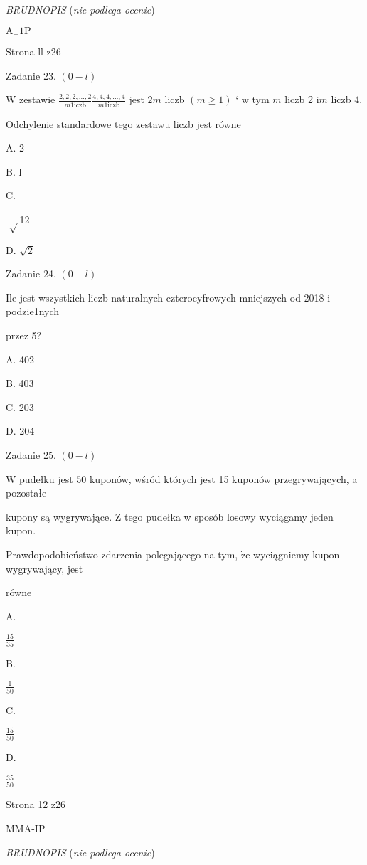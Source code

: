 \documentclass[a4paper,12pt]{article}
\begin{document}
{\it BRUDNOPIS} ({\it nie podlega ocenie})

$\mathrm{A}_{-}1\mathrm{P}$

Strona ll z26





Zadanie 23. $(0-l)$

$\mathrm{W}$ zestawie $\displaystyle \frac{2,2,2,\ldots,2}{m1\mathrm{i}\mathrm{c}\mathrm{z}\mathrm{b}}\frac{4,4,4,\ldots,4}{m1\mathrm{i}\mathrm{c}\mathrm{z}\mathrm{b}}$ jest $2m$ liczb $(m\geq 1)$ ` w tym $m$ liczb 2 $\mathrm{i} m$ liczb 4.

Odchylenie standardowe tego zestawu liczb jest równe

A. 2

B. l

C.

-$\sqrt{}$12

D. $\sqrt{2}$

Zadanie 24. $(0-l)$

Ile jest wszystkich liczb naturalnych czterocyfrowych mniejszych od 2018 i podzie1nych

przez 5?

A. 402

B. 403

C. 203

D. 204

Zadanie 25. $(0-l)$

$\mathrm{W}$ pudełku jest 50 kuponów, wśród których jest 15 kuponów przegrywających, a pozostałe

kupony są wygrywające. $\mathrm{Z}$ tego pudełka w sposób losowy wyciągamy jeden kupon.

Prawdopodobieństwo zdarzenia polegającego na tym, $\dot{\mathrm{z}}\mathrm{e}$ wyciągniemy kupon wygrywający, jest

równe

A.

$\displaystyle \frac{15}{35}$

B.

$\displaystyle \frac{1}{50}$

C.

$\displaystyle \frac{15}{50}$

D.

$\displaystyle \frac{35}{50}$

Strona 12 z26

MMA-IP





{\it BRUDNOPIS} ({\it nie podlega ocenie})
\end{document}
